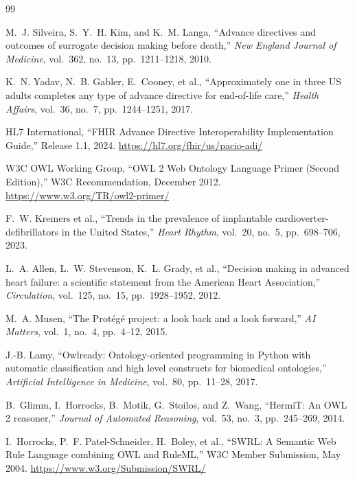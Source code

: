 \documentclass[11pt]{article}
\begin{document}
\begin{thebibliography}{99}
\small

M.~J. Silveira, S.~Y.~H. Kim, and K.~M. Langa,
``Advance directives and outcomes of surrogate decision making before death,''
\textit{New England Journal of Medicine}, vol.~362, no.~13, pp.~1211--1218, 2010.

K.~N. Yadav, N.~B. Gabler, E.~Cooney, et al.,
``Approximately one in three US adults completes any type of advance directive for end-of-life care,''
\textit{Health Affairs}, vol.~36, no.~7, pp.~1244--1251, 2017.

HL7 International,
``FHIR Advance Directive Interoperability Implementation Guide,''
Release 1.1, 2024.
\url{https://hl7.org/fhir/us/pacio-adi/}

W3C OWL Working Group,
``OWL 2 Web Ontology Language Primer (Second Edition),''
W3C Recommendation, December 2012.
\url{https://www.w3.org/TR/owl2-primer/}

F.~W. Kremers et al.,
``Trends in the prevalence of implantable cardioverter-defibrillators in the United States,''
\textit{Heart Rhythm}, vol.~20, no.~5, pp.~698--706, 2023.

L.~A. Allen, L.~W. Stevenson, K.~L. Grady, et al.,
``Decision making in advanced heart failure: a scientific statement from the American Heart Association,''
\textit{Circulation}, vol.~125, no.~15, pp.~1928--1952, 2012.

M.~A. Musen,
``The Prot\'eg\'e project: a look back and a look forward,''
\textit{AI Matters}, vol.~1, no.~4, pp.~4--12, 2015.

J.-B. Lamy,
``Owlready: Ontology-oriented programming in Python with automatic classification and high level constructs for biomedical ontologies,''
\textit{Artificial Intelligence in Medicine}, vol.~80, pp.~11--28, 2017.

B.~Glimm, I.~Horrocks, B.~Motik, G.~Stoilos, and Z.~Wang,
``HermiT: An OWL 2 reasoner,''
\textit{Journal of Automated Reasoning}, vol.~53, no.~3, pp.~245--269, 2014.

I.~Horrocks, P.~F. Patel-Schneider, H.~Boley, et al.,
``SWRL: A Semantic Web Rule Language combining OWL and RuleML,''
W3C Member Submission, May 2004.
\url{https://www.w3.org/Submission/SWRL/}


\end{thebibliography}
\end{document}
